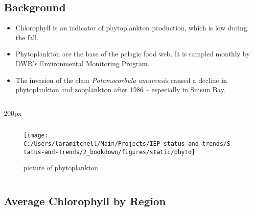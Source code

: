 \documentclass[
]{book}
\providecommand{\tightlist}{%
  \setlength{\itemsep}{0pt}\setlength{\parskip}{0pt}}
\begin{document}
\begin{columns-nocenter}

\begin{column}{0.7\textwidth}
\begin{column}

\hypertarget{background-2}{%
\subsection{Background}\label{background-2}}

\begin{itemize}
\tightlist
\item
  Chlorophyll is an indicator of phytoplankton production, which is low during the fall.
\item
  Phytoplankton are the base of the pelagic food web. It is sampled monthly by DWR's \href{https://emp.baydeltalive.com/wiki/12297}{Environmental Monitoring Program}.
\item
  The invasion of the clam \emph{Potamocorbula amurensis} caused a decline in phytoplankton and zooplankton after 1986 -- especially in Suisun Bay.
\end{itemize}

\end{column}
\end{column}

\begin{column}{200px\textwidth}
\begin{column}

\begin{figure}

{\centering \texttt{[image: C:/Users/laramitchell/Main/Projects/IEP\_status\_and\_trends/Status-and-Trends/2\_bookdown/figures/static/phyto]} 

}

\caption{picture of phytoplankton}\label{fig:unnamed-chunk-106}
\end{figure}

\end{column}
\end{column}

\end{columns-nocenter}

\hypertarget{average-chlorophyll-by-region}{%
\subsection{Average Chlorophyll by Region}\label{average-chlorophyll-by-region}}
\end{document}
